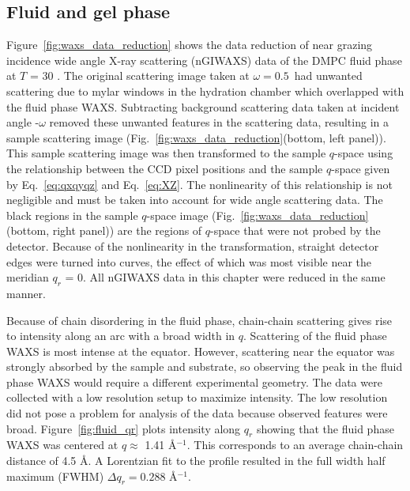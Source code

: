 \subsection{Fluid and gel phase}\label{sec:fluid_gel_phase}
Figure~\ref{fig:waxs_data_reduction} shows the data reduction of 
near grazing incidence wide angle X-ray scattering (nGIWAXS) data of
the DMPC fluid phase at $T$ = 30 \textcelsius.
The original scattering image taken at $\omega=0.5$\textdegree\ had unwanted
scattering due to mylar windows in the hydration chamber which
overlapped with the fluid phase WAXS.
Subtracting background scattering data taken at incident angle -$\omega$  
removed these unwanted features in the scattering data, 
resulting in a sample scattering image 
(Fig.~\ref{fig:waxs_data_reduction}(bottom, left panel)).
This sample scattering image was then transformed to the
sample $q$-space using the relationship between the CCD 
pixel positions and the sample $q$-space
given by Eq.~\ref{eq:qxqyqz} and Eq.~\ref{eq:XZ}. The nonlinearity of this
relationship is
not negligible and must be taken into account for wide angle scattering data.
The black regions in the sample $q$-space image
(Fig.~\ref{fig:waxs_data_reduction}(bottom, right panel))
are the regions of $q$-space that
were not probed by the detector. Because of the nonlinearity in the 
transformation, straight detector edges were turned into curves, the effect of
which was most visible near the meridian $q_r$ = 0. All nGIWAXS data
in this chapter were reduced in the same manner.

Because of chain disordering in the fluid phase, chain-chain scattering
gives rise to intensity along an arc \cite{ref:Mills08} with a broad
width in $q$. 
Scattering of the fluid phase WAXS
is most intense at the equator. However, scattering near the equator
was strongly absorbed by the sample and substrate, so observing the 
peak in the fluid phase WAXS would require a different experimental 
geometry.
The data were collected with a low resolution setup to maximize
intensity. The low resolution did not pose a problem for analysis of the 
data because observed features were broad.
Figure~\ref{fig:fluid_qr} plots intensity along $q_r$ showing that
the fluid phase WAXS was centered at $q \approx$ 1.41 \AA$^{-1}$. 
This corresponds to an average chain-chain distance of 4.5 \AA. 
A Lorentzian fit to the profile resulted in the full width half maximum
(FWHM) $\Delta q_r=0.288$ \AA$^{-1}$.

